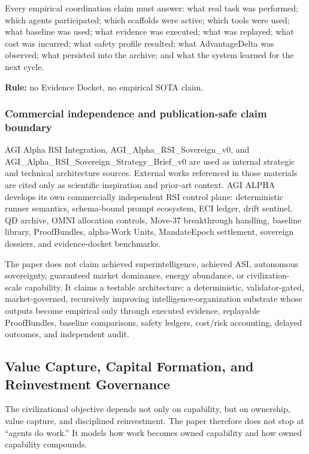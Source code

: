 \documentclass[
  11pt,
]{article}
\begin{document}
Every empirical coordination claim must answer: what real task was
performed; which agents participated; which scaffolds were active; which
tools were used; what baseline was used; what evidence was executed;
what was replayed; what cost was incurred; what safety profile resulted;
what AdvantageDelta was observed; what persisted into the archive; and
what the system learned for the next cycle.

\textbf{Rule:} no Evidence Docket, no empirical SOTA claim.

\subsubsection{Commercial independence and publication-safe claim
boundary}\label{commercial-independence-and-publication-safe-claim-boundary}

AGI Alpha RSI Integration, AGI\_Alpha\_RSI\_Sovereign\_v0, and
AGI\_Alpha\_RSI\_Sovereign\_Strategy\_Brief\_v0 are used as internal
strategic and technical architecture sources. External works referenced
in those materials are cited only as scientific inspiration and
prior-art context. AGI ALPHA develops its own commercially independent
RSI control plane: deterministic runner semantics, schema-bound prompt
ecosystem, ECI ledger, drift sentinel, QD archive, OMNI allocation
controls, Move-37 breakthrough handling, baseline library, ProofBundles,
alpha-Work Units, MandateEpoch settlement, sovereign dossiers, and
evidence-docket benchmarks.

The paper does not claim achieved superintelligence, achieved ASI,
autonomous sovereignty, guaranteed market dominance, energy abundance,
or civilization-scale capability. It claims a testable architecture: a
deterministic, validator-gated, market-governed, recursively improving
intelligence-organization substrate whose outputs become empirical only
through executed evidence, replayable ProofBundles, baseline
comparisons, safety ledgers, cost/risk accounting, delayed outcomes, and
independent audit.

\subsection{Value Capture, Capital Formation, and Reinvestment
Governance}\label{value-capture-capital-formation-and-reinvestment-governance}

The civilizational objective depends not only on capability, but on
ownership, value capture, and disciplined reinvestment. The paper
therefore does not stop at ``agents do work.'' It models how work
becomes owned capability and how owned capability compounds.
\end{document}
